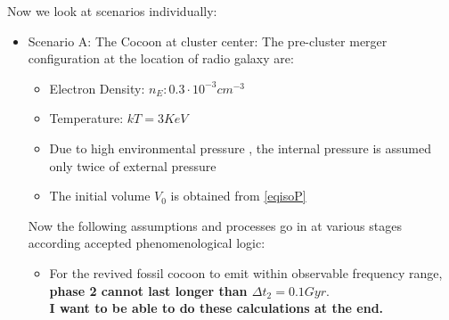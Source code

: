 \documentclass[12pt]{report}
\newcommand{\tbf}[1]{\textbf{#1}}
\begin{document}
Now we look at scenarios individually:
\begin{itemize}
\item {Scenario A: The Cocoon at cluster center:}
The pre-cluster merger configuration at the location of radio galaxy are:

\begin{itemize}
\item Electron Density: $n_E: 0.3 \cdot 10^{-3}cm^{-3}$
\item Temperature: $kT=3KeV$
\item Due to high environmental pressure , the internal pressure is assumed only twice of external pressure
\item The initial volume $V_0$ is obtained from \eqref{eqisoP} 
\end{itemize}
Now the following assumptions and processes go in at various stages according accepted phenomenological logic:
\begin{itemize}

 
\item For the revived fossil cocoon to emit within observable frequency range, \tbf{phase 2 cannot last longer than $\Delta t_2=0.1Gyr$}.\\

 \tbf{I want to be able to do these calculations at the end.}
 

\end{itemize}
\end{itemize}
\end{document}
